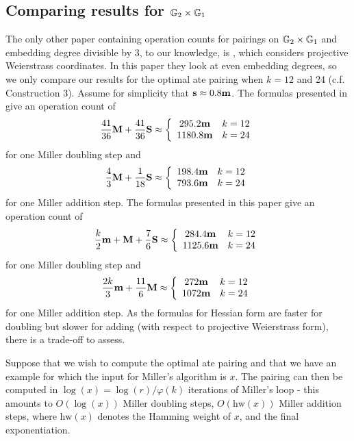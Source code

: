 \subsection{Comparing results for $\mathbb{G}_{2} \times \mathbb{G}_{1}$}

The only other paper containing operation counts for pairings on $\mathbb{G}_{2} \times \mathbb{G}_{1}$
and embedding degree divisible by 3, to our knowledge, is \cite{2009/craig}, which considers projective Weierstrass coordinates.
In this paper they look at even embedding degrees, so we only compare our results
for the optimal ate pairing when $k=12$ and 24 (c.f. Construction 3).
Assume for simplicity that $\textbf{s} \approx 0.8\textbf{m}$.
The formulas presented in \cite{2009/craig} give an operation count of
$$\frac{41}{36}\textbf{M} + \frac{41}{36}\textbf{S} \approx
\left\{ \begin{array}{cc}
295.2\textbf{m} & k=12 \\
1180.8\textbf{m} & k=24
\end{array} \right.$$ 
for one Miller doubling step
and
$$\frac{4}{3}\textbf{M} + \frac{1}{18}\textbf{S} \approx
\left\{ \begin{array}{cc}
198.4\textbf{m} & k=12 \\
793.6\textbf{m} & k=24
\end{array} \right.$$ 
for one Miller addition step.
The formulas presented in this paper give an operation count of
$$\frac{k}{2}\textbf{m} + \textbf{M} + \frac{7}{6}\textbf{S} \approx
\left\{ \begin{array}{cc}
284.4\textbf{m} & k=12 \\
1125.6\textbf{m} & k=24
\end{array} \right.$$ 
for one Miller doubling step
and
$$\frac{2k}{3}\textbf{m} + \frac{11}{6}\textbf{M} \approx
\left\{ \begin{array}{cc}
272\textbf{m} & k=12 \\
1072\textbf{m} & k=24
\end{array} \right.$$ 
for one Miller addition step.
As the formulas for Hessian form are faster for doubling but slower for adding (with respect to projective Weierstrass form), there is a trade-off to assess.

Suppose that we wish to compute the optimal ate pairing and that we have 
an example for which the input for Miller's algorithm is $x$. 
The pairing can then be computed in $\log(x) = \log(r)/\varphi(k)$
iterations of Miller's loop - this amounts to $O(\log(x))$ Miller doubling steps,
$O(\text{hw}(x))$ Miller addition steps, where $\text{hw}(x)$ denotes the Hamming weight of $x$, and the final exponentiation.

